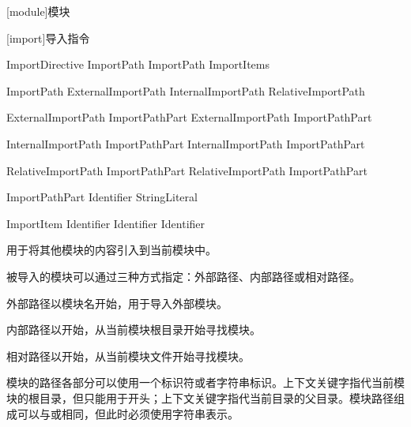 
[module]{模块}

[import]{导入指令}

\begin{bnf}{ImportDirective}
     ImportPath \terminal{;} \br
     ImportPath \terminal{:} ImportItems \terminal{;}
\end{bnf}

\begin{bnf}{ImportPath}
    ExternalImportPath \br
    InternalImportPath \br
    RelativeImportPath
\end{bnf}

\begin{bnf}{ExternalImportPath}
    ImportPathPart \br
    ExternalImportPath  ImportPathPart
\end{bnf}

\begin{bnf}{InternalImportPath}
      ImportPathPart \br
    InternalImportPath  ImportPathPart
\end{bnf}

\begin{bnf}{RelativeImportPath}
     ImportPathPart \br
    RelativeImportPath  ImportPathPart
\end{bnf}

\begin{bnf}{ImportPathPart}
    Identifier \br
    StringLiteral \br
\end{bnf}

\begin{bnf}{ImportItem}
    \terminal{*} \br
     \br
    Identifier \br
    Identifier  Identifier
\end{bnf}

\pnum
{}用于将其他模块的内容引入到当前模块中。

\pnum
被导入的模块可以通过三种方式指定：外部路径、内部路径或相对路径。

\pnum
外部路径以模块名开始，用于导入外部模块。

\pnum
内部路径以开始，从当前模块根目录开始寻找模块。

\pnum
相对路径以开始，从当前模块文件开始寻找模块。

\pnum
模块的路径各部分可以使用一个标识符或者字符串标识。上下文关键字指代当前模块的根目录，但只能用于开头；上下文关键字指代当前目录的父目录。模块路径组成可以与或相同，但此时必须使用字符串表示。

